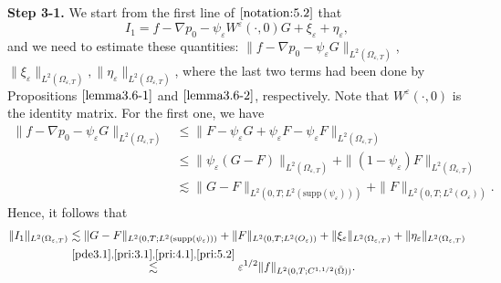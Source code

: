 \documentclass[13pt,CJK]{article}
\theoremstyle{plain}                       %
\theoremstyle{remark}
\numberwithin{equation}{section}
\begin{document}
\textbf{Step 3-1.}
We start from the first line of $\eqref{notation:5.2}$ that
\begin{equation*}
I_1=f-\nabla p_0-\psi_{\varepsilon}W^{\varepsilon}(\cdot,0)G
+\xi_{\varepsilon}+\eta_{\varepsilon},
\end{equation*}
and we need to estimate these quantities:
$\|f-\nabla p_0-\psi_{\varepsilon}G\|_{
L^2(\Omega_{\varepsilon,T})}$,
$\|\xi_{\varepsilon}\|_{L^2(\Omega_{\varepsilon,T})}
,\|\eta_{\varepsilon}\|_{L^2(\Omega_{\varepsilon,T})}$,
where the last two terms had been done by Propositions
$\ref{lemma3.6-1}$ and $\ref{lemma3.6-2}$, respectively.
Note that $W^\varepsilon(\cdot,0)$ is the identity matrix.
For the first one, we have
\begin{equation*}
\begin{aligned}
\|f-\nabla p_0-\psi_{\varepsilon}G\|_{L^2(\Omega_{\varepsilon,T})}
&\leq
\|F-\psi_{\varepsilon}G+\psi_{\varepsilon}F
-\psi_{\varepsilon}F
\|_{L^2(\Omega_{\varepsilon,T})}\\
&\leq \|\psi_{\varepsilon}(G-F)\|_{
L^2(\Omega_{\varepsilon,T})}+
\|(1-\psi_{\varepsilon})F\|_{
L^2(\Omega_{\varepsilon,T})}\\
&\lesssim \|G-F\|_{L^2(0,T;L^2(\text{supp}(\psi_{\varepsilon})))}+\|F\|_{
L^2(0,T;L^2(O_{\varepsilon}))}.
\end{aligned}
\end{equation*}
Hence, it follows that
\begin{equation}\label{pde5.3}
\begin{aligned}
\|I_1\|_{L^2(\Omega_{\varepsilon,T})}
&\lesssim \|G-F\|_{L^2(0,T;L^2(\text{supp}(\psi_{\varepsilon})))}+\|F\|_{
L^2(0,T;L^2(O_{\varepsilon}))}+\|\xi_{\varepsilon}\|_{L^2(\Omega_{\varepsilon,T})}
+\|\eta_{\varepsilon}\|_{L^2(\Omega_{\varepsilon,T})}\\
&\overset{\eqref{pde3.1},\eqref{pri:3.1},\eqref{pri:4.1},
\eqref{pri:5.2}}{\lesssim}
\varepsilon^{1/2}\|f\|_{L^2(0,T;C^{1,1/2}(\bar{\Omega}))}.
\end{aligned}
\end{equation}
\end{document}
